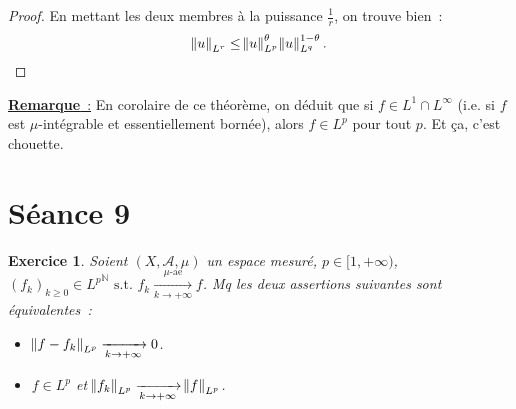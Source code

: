 \documentclass{article}
\newtheorem{ex}{Exercice}[section]
\theoremstyle{definition}
\newcommand{\pinfty}{{+\infty}}
\newcommand{\st}{\text{ s.t. }}
\newcommand{\N}{{\mathbb N}}
\begin{document}
\begin{proof}
En mettant les deux membres à la puissance $\frac 1r$, on trouve bien~:
\[\norm u_{L^r} \leq \norm u_{L^p}^\theta\norm u_{L^q}^{1-\theta}.\]

\end{proof}

\underline {\textbf {Remarque}~:} En corolaire de ce théorème, on déduit que si $f \in L^1 \cap L^\infty$ (i.e. si $f$ est $\mu$-intégrable et essentiellement bornée), alors
$f \in L^p$ pour tout $p$. Et ça, c'est chouette.

\newpage
\section{Séance 9}

\begin{ex} Soient $(X, \mathcal A, \mu)$ un espace mesuré, $p \in [1, \pinfty)$, $(f_k)_{k \geq 0} \in {L^p}^\N \st f_k \xrightarrow[k \to \pinfty]{\mu\text{-ae}} f$. Mq
les deux assertions suivantes sont équivalentes~:
\begin{itemize}
	\item[a)] $\norm {f-f_k}_{L^p} \xrightarrow[k \to \pinfty]{} 0$.
	\item[b)] $f \in L^p$ et $\norm {f_k}_{L^p} \xrightarrow[k \to \pinfty]{} \norm f_{L^p}$.
\end{itemize}
\end{ex}
\end{document}
